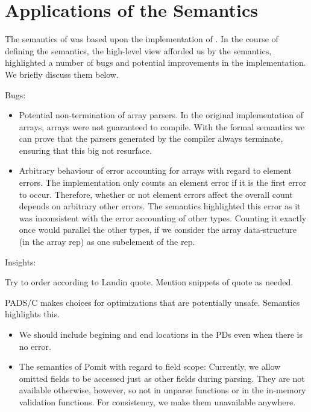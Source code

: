 \section{Applications of the Semantics}
\label{sec:applications}

The semantics of \ddc{} was based upon the implementation of \pads{}.
In the course of defining the semantics, the high-level view afforded
us by the semantics, highlighted a number of bugs and potential
improvements in the \pads{} implementation. We briefly discuss them
below.

Bugs:
\begin{itemize}
\item Potential non-termination of array parsers. In the original
  implementation of \pads{} arrays, arrays were not guaranteed to
  compile. With the formal semantics we can prove that the parsers
  generated by the compiler always terminate, ensuring that this big
  not resurface.

\item Arbitrary behaviour of error accounting for arrays with regard
  to element errors. The implementation only counts an element error
  if it is the first error to occur. Therefore, whether or not element
  errors affect the overall count depends on arbitrary other errors.
  The semantics highlighted this error as it was inconsistent with the
  error accounting of other types. Counting it exactly once would
  parallel the other types, if we consider the array data-structure
  (in the array rep) as one subelement of the rep.
\end{itemize} 

Insights:

Try to order according to Landin quote. Mention snippets of quote as needed.

PADS/C makes choices for optimizations that are potentially
unsafe. Semantics highlights this.
\begin{itemize}
\item We should include begining and end locations in the PDs even when there
   is no error.

 \item The semantics of Pomit with regard to field scope: Currently,
   we allow omitted fields to be accessed just as other fields during
   parsing.  They are not available otherwise, however, so not in
   unparse functions or in the in-memory validation functions. For
   consistency, we make them unavailable anywhere.
\end{itemize}


